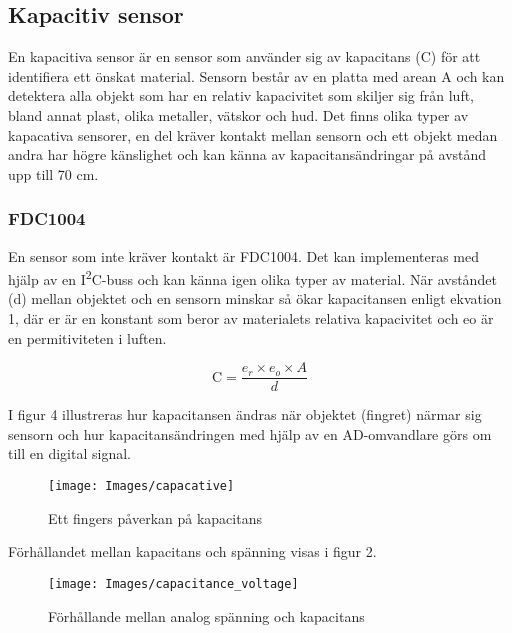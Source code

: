 \documentclass[11pt]{article}
\begin{document}
\begin{flushleft}
\subsection{Kapacitiv sensor}
En kapacitiva sensor är en sensor som använder sig av kapacitans (C) för att identifiera ett önskat material. Sensorn består av en platta med arean A och kan detektera alla objekt som har en relativ kapacivitet som skiljer sig från luft, bland annat plast, olika metaller, vätskor och hud. Det finns olika typer av kapacativa sensorer, en del kräver kontakt mellan sensorn och ett objekt medan andra har högre känslighet och kan känna av kapacitansändringar på avstånd upp till 70 cm. 

\subsubsection{FDC1004}
En sensor som inte kräver kontakt är FDC1004. Det kan implementeras med hjälp av en I\textsuperscript{2}C-buss och kan känna igen olika typer av material. När avståndet (d) mellan objektet och en sensorn minskar så ökar kapacitansen enligt ekvation 1, där er är en konstant som beror av materialets relativa kapacivitet och eo är en permitiviteten i luften.

\begin{equation*}
	\textrm{C} = \frac {e_{r} \times e_{o} \times A}{d}						
\end{equation*}

I figur 4 illustreras hur kapacitansen ändras när objektet (fingret) närmar sig sensorn och hur kapacitansändringen med hjälp av en AD-omvandlare görs om till en digital signal. 

\begin{figure}[htbp]
	\centering
	\texttt{[image: Images/capacative]}
	\caption{Ett fingers påverkan på kapacitans \label{capacative}}
\end{figure}

Förhållandet mellan kapacitans och spänning visas i figur 2.

\begin{figure}[htbp]
	\centering
	\texttt{[image: Images/capacitance\_voltage]}
	\caption{Förhållande mellan analog spänning och kapacitans \label{capacitance_voltage}}
\end{figure}





\end{flushleft}
\end{document}
